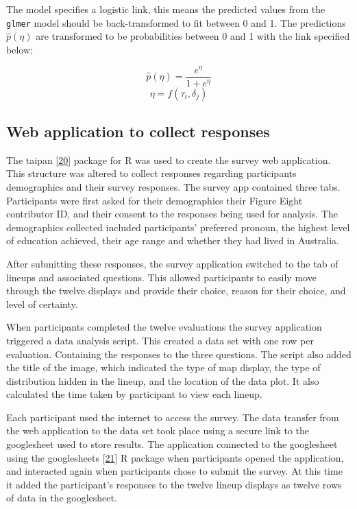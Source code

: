 \documentclass[conference,final,]{IEEEtran}
\begin{document}
The model specifies a logistic link, this means the predicted values from the \texttt{glmer} model should be back-transformed to fit between 0 and 1. The predictions \(\widehat{p}(\eta)\) are transformed to be probabilities between 0 and 1 with the link specified below:

\[\widehat{p}(\eta) = \frac{e^{\eta}}{1 + e^{\eta}}\] \label{eq:transform}
\[\eta = f(\tau_i,\delta_j)\]

\hypertarget{web-application-to-collect-responses}{%
\subsection{Web application to collect responses}\label{web-application-to-collect-responses}}

The taipan {[}\protect\hyperlink{ref-taipan}{20}{]} package for R was used to create the survey web application.
This structure was altered to collect responses regarding participants demographics and their survey responses.
The survey app contained three tabs. Participants were first asked for their demographics their Figure Eight contributor ID, and their consent to the responses being used for analysis. The demographics collected included participants' preferred pronoun, the highest level of education achieved, their age range and whether they had lived in Australia.

After submitting these responses, the survey application switched to the tab of lineups and associated questions. This allowed participants to easily move through the twelve displays and provide their choice, reason for their choice, and level of certainty.

When participants completed the twelve evaluations the survey application triggered a data analysis script. This created a data set with one row per evaluation. Containing the responses to the three questions. The script also added the title of the image, which indicated the type of map display, the type of distribution hidden in the lineup, and the location of the data plot. It also calculated the time taken by participant to view each lineup.

Each participant used the internet to access the survey.
The data transfer from the web application to the data set took place using a secure link to the googlesheet used to store results. The application connected to the googlesheet using the googlesheets {[}\protect\hyperlink{ref-sheets}{21}{]} R package when participants opened the application, and interacted again when participants chose to submit the survey. At this time it added the participant's responses to the twelve lineup displays as twelve rows of data in the googlesheet.
\end{document}

